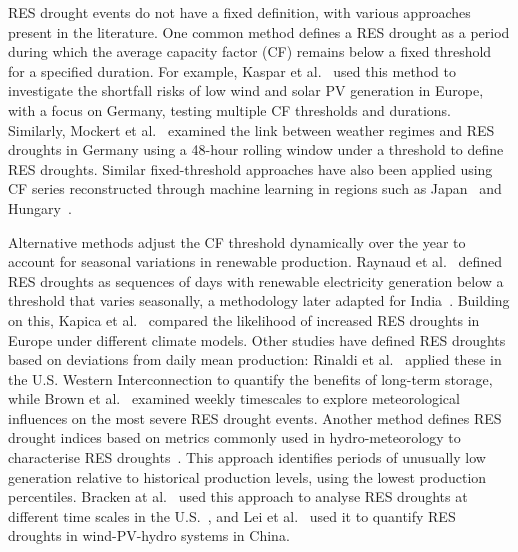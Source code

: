 \documentclass[preprint, 12pt]{elsarticle}
\begin{document}
RES drought events do not have a fixed definition, with various approaches present in the literature. One common method defines a RES drought as a period during which the average capacity factor (CF) remains below a fixed threshold for a specified duration. For example, Kaspar et al.~\citep{kaspar2019drought} used this method to investigate the shortfall risks of low wind and solar PV generation in Europe, with a focus on Germany, testing multiple CF thresholds and durations. Similarly, Mockert et al.~\citep{mockert2023drought} examined the link between weather regimes and RES droughts in Germany using a 48-hour rolling window under a threshold to define RES droughts. Similar fixed-threshold approaches have also been applied using CF series reconstructed through machine learning in regions such as Japan~\citep{ohba2022drought} and Hungary~\citep{mayer2023drought}.

Alternative methods adjust the CF threshold dynamically over the year to account for seasonal variations in renewable production. Raynaud et al.~\citep{raynaud2018drought} defined RES droughts as sequences of days with renewable electricity generation below a threshold that varies seasonally, a methodology later adapted for India~\citep{gangopadhyay2022drought}. Building on this, Kapica et al.~\citep{kapica2024drought} compared the likelihood of increased RES droughts in Europe under different climate models. Other studies have defined RES droughts based on deviations from daily mean production: Rinaldi et al.~\citep{rinaldi2021drought} applied these in the U.S. Western Interconnection to quantify the benefits of long-term storage, while Brown et al.~\citep{brown2021drought} examined weekly timescales to explore meteorological influences on the most severe RES drought events. Another method defines RES drought indices based on metrics commonly used in hydro-meteorology to characterise RES droughts~\citep{allen2023drought}. This approach identifies periods of unusually low generation relative to historical production levels, using the lowest production percentiles. Bracken at al.~\citep{bracken2024drought} used this approach to analyse RES droughts at different time scales in the U.S.~\citep{bracken2024drought}, and Lei et al.~\citep{lei2024drought} used it to quantify RES droughts in wind-PV-hydro systems in China.
\end{document}
